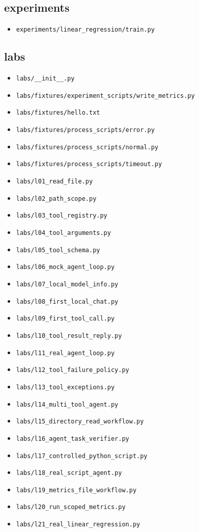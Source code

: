 \documentclass[UTF8,zihao=-4,fontset=fandol]{ctexart}
\begin{document}
\subsection{experiments}
\begin{itemize}
\item \nolinkurl{experiments/linear_regression/train.py}
\end{itemize}

\subsection{labs}
\begin{itemize}
\item \nolinkurl{labs/__init__.py}
\item \nolinkurl{labs/fixtures/experiment_scripts/write_metrics.py}
\item \nolinkurl{labs/fixtures/hello.txt}
\item \nolinkurl{labs/fixtures/process_scripts/error.py}
\item \nolinkurl{labs/fixtures/process_scripts/normal.py}
\item \nolinkurl{labs/fixtures/process_scripts/timeout.py}
\item \nolinkurl{labs/l01_read_file.py}
\item \nolinkurl{labs/l02_path_scope.py}
\item \nolinkurl{labs/l03_tool_registry.py}
\item \nolinkurl{labs/l04_tool_arguments.py}
\item \nolinkurl{labs/l05_tool_schema.py}
\item \nolinkurl{labs/l06_mock_agent_loop.py}
\item \nolinkurl{labs/l07_local_model_info.py}
\item \nolinkurl{labs/l08_first_local_chat.py}
\item \nolinkurl{labs/l09_first_tool_call.py}
\item \nolinkurl{labs/l10_tool_result_reply.py}
\item \nolinkurl{labs/l11_real_agent_loop.py}
\item \nolinkurl{labs/l12_tool_failure_policy.py}
\item \nolinkurl{labs/l13_tool_exceptions.py}
\item \nolinkurl{labs/l14_multi_tool_agent.py}
\item \nolinkurl{labs/l15_directory_read_workflow.py}
\item \nolinkurl{labs/l16_agent_task_verifier.py}
\item \nolinkurl{labs/l17_controlled_python_script.py}
\item \nolinkurl{labs/l18_real_script_agent.py}
\item \nolinkurl{labs/l19_metrics_file_workflow.py}
\item \nolinkurl{labs/l20_run_scoped_metrics.py}
\item \nolinkurl{labs/l21_real_linear_regression.py}
\end{itemize}
\end{document}
